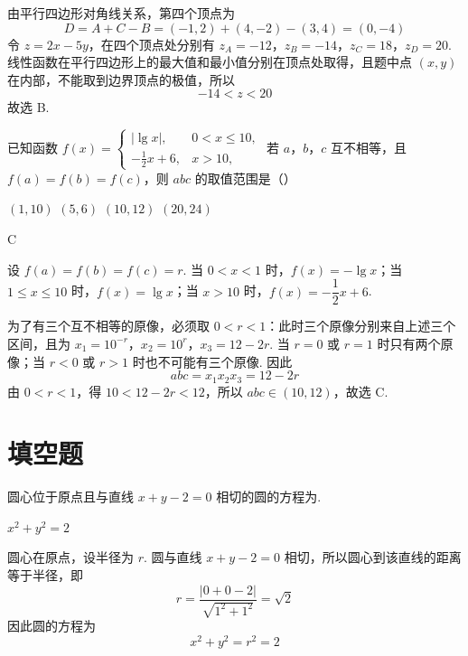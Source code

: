 \begin{solution}
由平行四边形对角线关系，第四个顶点为
\[
D=A+C-B=(-1,2)+(4,-2)-(3,4)=(0,-4)
\]
令 \(z=2x-5y\)，在四个顶点处分别有
\(z_A=-12\)，\(z_B=-14\)，\(z_C=18\)，\(z_D=20\).
线性函数在平行四边形上的最大值和最小值分别在顶点处取得，且题中点 \((x,y)\) 在内部，不能取到边界顶点的极值，所以
\[
-14<z<20
\]
故选 B.
\end{solution}

\begin{problem}
已知函数 \( f(x) = \begin{cases}
|\lg x|, & 0 < x \leqslant 10,\\
-\frac{1}{2}x + 6, & x > 10,
\end{cases} \) 若 \(a\)，\(b\)，\(c\) 互不相等，且 \( f(a) = f(b) = f(c) \)，则 \( abc \) 的取值范围是（\quad）

\choices
    {\((1,10)\)}
    {\((5,6)\)}
    {\((10,12)\)}
    {\((20,24)\)}
\end{problem}

\begin{answer}
C
\end{answer}

\begin{solution}
设 \(f(a)=f(b)=f(c)=r\). 当 \(0<x<1\) 时，\(f(x)=-\lg x\)；当 \(1\leqslant x\leqslant10\) 时，\(f(x)=\lg x\)；当 \(x>10\) 时，\(f(x)=-\dfrac12x+6\).

为了有三个互不相等的原像，必须取 \(0<r<1\)：此时三个原像分别来自上述三个区间，且为
\(x_1=10^{-r}\)，\(x_2=10^{r}\)，\(x_3=12-2r\).
当 \(r=0\) 或 \(r=1\) 时只有两个原像；当 \(r<0\) 或 \(r>1\) 时也不可能有三个原像. 因此
\[
abc=x_1x_2x_3=12-2r
\]
由 \(0<r<1\)，得 \(10<12-2r<12\)，所以 \(abc\in(10,12)\)，故选 C.
\end{solution}

\section{填空题}

\begin{problem}
圆心位于原点且与直线 \(x + y - 2 = 0\) 相切的圆的方程为\fillinblank{}.
\end{problem}

\begin{answer}
\(x^{2}+y^{2}=2\)
\end{answer}

\begin{solution}
圆心在原点，设半径为 \(r\). 圆与直线 \(x+y-2=0\) 相切，所以圆心到该直线的距离等于半径，即
\[
r=\frac{|0+0-2|}{\sqrt{1^{2}+1^{2}}}=\sqrt{2}
\]
因此圆的方程为
\[
x^{2}+y^{2}=r^{2}=2
\]
\end{solution}

